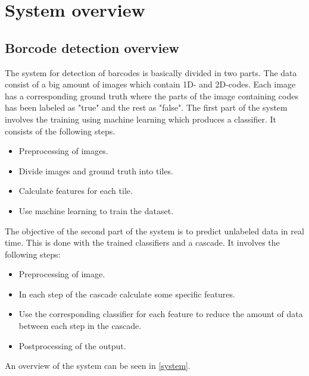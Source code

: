\chapter{System overview}
\label{sec:System overview}

\section{Borcode detection overview}
\label{sec:Barcode detection overview}
The system for detection of barcodes is basically divided in two parts. The data consist of a big amount of images which contain 1D- and 2D-codes. Each image has a corresponding ground truth where the parts of the image containing codes has been labeled as "true" and the rest as "false". The first part of the system involves the training using machine learning which produces a classifier. It consists of the following steps.

\begin{itemize}
	\item Preprocessing of images.
	\item Divide images and ground truth into tiles.
	\item Calculate features for each tile.
	\item Use machine learning to train the dataset.
\end{itemize}

The objective of the second part of the system is to predict unlabeled data in real time. This is done with the trained classifiers and a cascade. It involves the following steps:

\begin{itemize}
	\item Preprocessing of image.
	\item In each step of the cascade calculate some specific features.
	\item Use the corresponding classifier for each feature to reduce the amount of data between each step in the cascade.
	\item Postprocessing of the output.
\end{itemize}
An overview of the system can be seen in \ref{system}.

